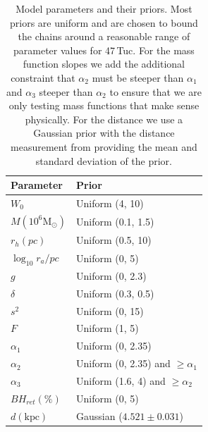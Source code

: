 \begin{table}
    \centering
    \caption{Model parameters and their priors. Most priors are uniform and are chosen to bound the
        chains around a reasonable range of parameter values for 47\,Tuc. For the mass function slopes
        we add the additional constraint that $\alpha_2$ must be steeper than $\alpha_1$ and $\alpha_3$
        steeper than $\alpha_2$ to ensure that we are only testing mass functions that make sense
        physically. For the distance we use a Gaussian prior with the distance measurement from
        \citet{Baumgardt2021} providing the mean and standard deviation of the prior.}
    \begin{tabular}{l l}

        \hline
        Parameter                      & Prior                                \\
        \hline
        $W_0$                          & Uniform (4, 10)                      \\
        $M (10^6 \mathrm{M}_{\odot}) $ & Uniform (0.1, 1.5)                   \\
        $r_h (pc)$                     & Uniform (0.5, 10)                    \\
        $\log_{10}{r_a / pc}$          & Uniform (0, 5)                       \\
        $g$                            & Uniform (0, 2.3)                     \\
        $\delta$                       & Uniform (0.3, 0.5)                   \\
        $s^2$                          & Uniform (0, 15)                      \\
        $F$                            & Uniform (1, 5)                       \\
        $\alpha_1$                     & Uniform (0, 2.35)                    \\
        $\alpha_2$                     & Uniform (0, 2.35) and $\ge \alpha_1$ \\
        $\alpha_3$                     & Uniform (1.6, 4) and $\ge \alpha_2$  \\
        $BH_{ret} (\%)$                & Uniform (0, 5)                       \\
        $d (\mathrm{kpc}) $            & Gaussian ($4.521 \pm 0.031$)         \\
        \hline
    \end{tabular}
    \label{tab:priors}
\end{table}

